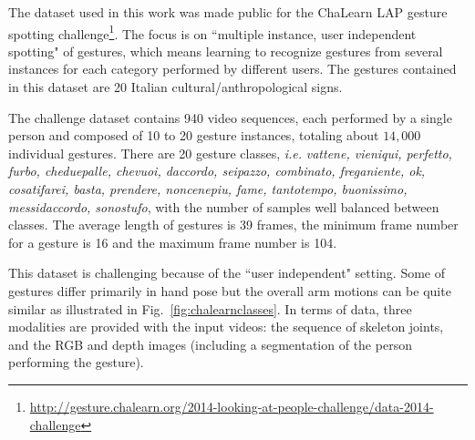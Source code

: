 
The dataset used in this work was made public for the ChaLearn LAP \cite{chalearnLAP} gesture spotting challenge\footnote{\href{http://gesture.chalearn.org/2014-looking-at-people-challenge/data-2014-challenge}{http://gesture.chalearn.org/2014-looking-at-people-challenge/data-2014-challenge}}.
%
The focus  is on ``multiple instance, user independent spotting" of gestures, which means learning to recognize gestures from several instances for each category performed by different users. The gestures contained in this dataset are 20 Italian cultural/anthropological signs.

The challenge dataset contains 940 video sequences, each performed by a single person and composed of 10 to 20 gesture instances, totaling about $14,000$ individual gestures.
%
There are 20 gesture classes, \emph{i.e.} \emph{vattene, vieniqui, perfetto, furbo, cheduepalle, chevuoi, daccordo, seipazzo, combinato, freganiente, ok, cosatifarei, basta, prendere, noncenepiu, fame, tantotempo, buonissimo, messidaccordo, sonostufo}, with the number of samples well balanced between classes.
The average length of gestures is 39 frames, the minimum frame number for a gesture is 16  and the maximum frame number is 104.

This dataset is challenging because of the ``user independent" setting. Some of gestures differ primarily in hand pose but the overall arm motions can be quite similar as illustrated in Fig.~\ref{fig:chalearnclasses}.
In terms of data, three modalities are provided with the input videos: the sequence of skeleton joints, and the RGB and depth images
(including a segmentation of the person performing the gesture).

